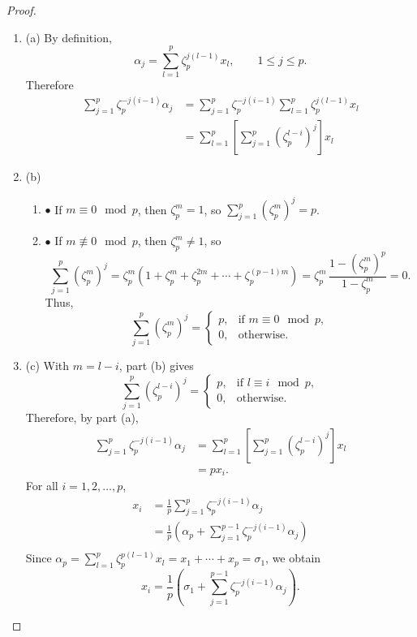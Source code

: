 \documentclass[11pt,a4paper]{article}
\newcommand{\be} {\begin{enumerate}}
\newcommand{\ee} {\end{enumerate}}
\begin{document}
\begin{proof}
\be
\item[(a)] By definition,
$$\alpha_j = \sum_{l=1}^p \zeta_p^{j(l-1)}x_l, \qquad 1\leq j \leq p.$$
Therefore
\begin{align*}
\sum_{j=1}^p \zeta_p^{-j(i-1)}\alpha_j &= \sum_{j=1}^p \zeta_p^{-j(i-1)} \sum_{l=1}^p \zeta_p^{j(l-1)}x_l\\
&= \sum_{l=1}^p \left [\sum_{j=1}^p( \zeta_p^{l-i})^j  \right ] x_l
\end{align*}

\item[(b)]
  \be
  \item[$\bullet$] If $m\equiv 0 \mod p$, then $\zeta_p^m = 1$, so $\sum\limits_{j=1}^p (\zeta_p^m)^j = p$.
  \item[$\bullet$] If $m\not \equiv 0 \mod p$, then $\zeta_p^m  \ne 1$, so
  $$\sum_{j=1}^p (\zeta_p^m)^j  =\zeta_p^m(1+\zeta_p^m+ \zeta_p^{2m}+ \cdots+ \zeta_p^{(p-1)m}) = \zeta_p^m \, \frac{1- (\zeta_p^{m})^p}{1 - \zeta_p^m} = 0.
  $$
  Thus,
  $$
\sum_{j=1}^p (\zeta_p^m)^j =
\left\{
\begin{array}{ll}
 p, &  \text{if }m\equiv 0 \mod p,    \\
 0, &  \text{otherwise}.   
\end{array}
\right.
$$
  \ee
  
\item[(c)] With $m=l-i$, part (b) gives
$$ \sum_{j=1}^p( \zeta_p^{l-i})^j =
\left\{
\begin{array}{ll}
 p, &  \text{if } l\equiv i \mod p,    \\
 0, &  \text{otherwise}.   
\end{array}
\right.
$$
Therefore, by part (a),
\begin{align*}
\sum_{j=1}^p \zeta_p^{-j(i-1)}\alpha_j &= \sum_{l=1}^p \left [\sum_{j=1}^p( \zeta_p^{l-i})^j  \right ] x_l\\
&= p x_i.
\end{align*}
For all $i=1,2,\ldots,p$,
\begin{align*}
x_i &= \frac{1}{p} \sum_{j=1}^p \zeta_p^{-j(i-1)}\alpha_j \\
&=\frac{1}{p} \left (\alpha_p +  \sum_{j=1}^{p-1} \zeta_p^{-j(i-1)}\alpha_j \right)\\
\end{align*}
Since $ \alpha_p =  \sum_{l=1}^p \zeta_p^{p(l-1)}x_l = x_1+\cdots+x_p = \sigma_1$, we obtain
$$x_i = \frac{1}{p}\left( \sigma_1 + \sum_{j=1}^{p-1} \zeta_p^{-j(i-1)} \alpha_j \right).$$
\ee
\end{proof}
\end{document}
